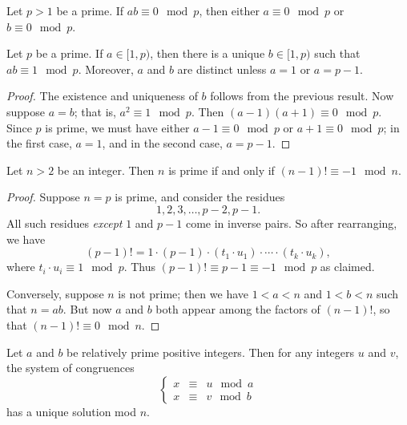 \begin{cor}
Let \(p > 1\) be a prime. If \(ab \equiv 0 \mod p\), then either \(a \equiv 0 \mod p\) or \(b \equiv 0 \mod p\).
\end{cor}

\begin{cor}
Let \(p\) be a prime. If \(a \in [1,p)\), then there is a unique \(b \in [1,p)\) such that \(ab \equiv 1 \mod p\). Moreover, \(a\) and \(b\) are distinct unless \(a = 1\) or \(a = p-1\).
\end{cor}

\begin{proof}
The existence and uniqueness of \(b\) follows from the previous result. Now suppose \(a = b\); that is, \(a^2 \equiv 1 \mod p\). Then \((a-1)(a+1) \equiv 0 \mod p\). Since \(p\) is prime, we must have either \(a-1 \equiv 0 \mod p\) or \(a+1 \equiv 0 \mod p\); in the first case, \(a = 1\), and in the second case, \(a = p-1\).
\end{proof}

\begin{cor}
Let \(n > 2\) be an integer. Then \(n\) is prime if and only if \((n-1)! \equiv -1 \mod n\).
\end{cor}

\begin{proof}
Suppose \(n = p\) is prime, and consider the residues \[1, 2, 3, \ldots, p-2, p-1.\] All such residues \emph{except} \(1\) and \(p-1\) come in inverse pairs. So after rearranging, we have \[ (p-1)! = 1 \cdot (p-1) \cdot (t_1 \cdot u_1) \cdot \cdots \cdot (t_k \cdot u_k), \] where \(t_i \cdot u_i \equiv 1 \mod p\). Thus \((p-1)! \equiv p-1 \equiv -1 \mod p\) as claimed.

Conversely, suppose \(n\) is not prime; then we have \(1 < a < n\) and \(1 < b < n\) such that \(n = ab\). But now \(a\) and \(b\) both appear among the factors of \((n-1)!\), so that \((n-1)! \equiv 0 \mod n\).
\end{proof}

\begin{prop}
Let \(a\) and \(b\) be relatively prime positive integers. Then for any integers \(u\) and \(v\), the system of congruences \[ \left\{ \begin{array}{rcl} x & \equiv & u \mod a \\ x & \equiv & v \mod b \end{array} \right. \] has a unique solution mod \(n\).
\end{prop}

